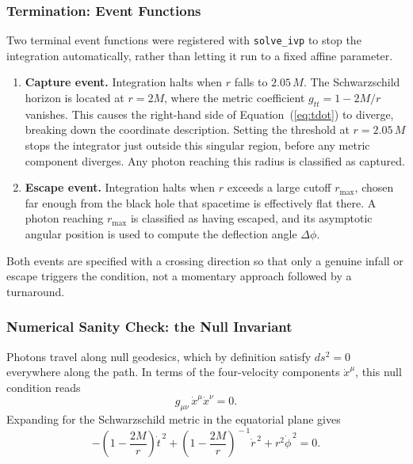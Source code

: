 \documentclass[12pt,a4paper]{article}
\begin{document}
\subsubsection{Termination: Event Functions}
Two terminal event functions were registered with \texttt{solve\_ivp} to stop the integration automatically, rather than letting it run to a fixed affine parameter.

\begin{enumerate}
    \item \textbf{Capture event.} Integration halts when $r$ falls to $2.05\,M$.
    The Schwarzschild horizon is located at $r = 2M$, where the metric coefficient
    $g_{tt} = 1 - 2M/r$ vanishes. This causes the right-hand side of
    Equation~(\ref{eq:tdot}) to diverge, breaking down the coordinate description.
    Setting the threshold at $r = 2.05\,M$ stops the integrator just outside this
    singular region, before any metric component diverges. Any photon reaching this
    radius is classified as captured.

    \item \textbf{Escape event.} Integration halts when $r$ exceeds a large cutoff
    $r_\mathrm{max}$, chosen far enough from the black hole that spacetime is
    effectively flat there. A photon reaching $r_\mathrm{max}$ is classified as having
    escaped, and its asymptotic angular position is used to compute the deflection
    angle $\Delta\phi$.
\end{enumerate}

Both events are specified with a crossing direction so that only a genuine infall or escape triggers the condition, not a momentary approach followed by a turnaround.

\subsubsection{Numerical Sanity Check: the Null Invariant}
Photons travel along null geodesics, which by definition satisfy $ds^{2} = 0$ everywhere along the path. In terms of the four-velocity components $\dot{x}^{\mu}$, this null condition reads
\begin{equation}
    g_{\mu\nu}\,\dot{x}^{\mu}\dot{x}^{\nu} = 0.
    \label{eq:null_invariant}
\end{equation}
Expanding for the Schwarzschild metric in the equatorial plane gives
\begin{equation}
    -\!\left(1 - \frac{2M}{r}\right)\dot{t}^{\,2}
    +\left(1 - \frac{2M}{r}\right)^{\!-1}\!\dot{r}^{\,2}
    + r^{2}\dot{\phi}^{\,2} = 0.
\end{equation}
\end{document}
